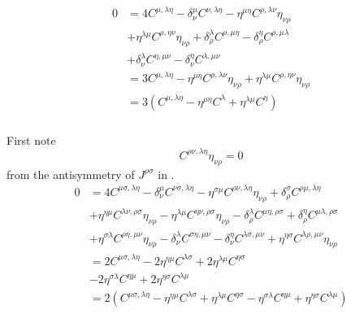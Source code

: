 \subsubsection{ }
\begin{align*}
	0&=4 C^{\mu,\lambda \eta}-\delta^\mu_\nu C^{\nu,\lambda \eta}-\eta^{\mu \eta}C^{\rho,\lambda \nu}\eta_{\nu\rho}\\
	&+\eta^{\lambda\mu} C^{\rho,\eta \nu}\eta_{\nu\rho}+\delta^\lambda_\rho C^{\rho,\mu \eta}-\delta^\eta_\rho C^{\rho,\mu \lambda}\\
	&+\delta^\lambda_\nu C^{\eta,\mu\nu}-\delta^\eta_\nu C^{\lambda, \mu \nu}\\
	&=3C^{\mu,\lambda \eta} -\eta^{\mu \eta}C^{\rho,\lambda \nu}\eta_{\nu\rho}
	+\eta^{\lambda\mu} C^{\rho,\eta \nu}\eta_{\nu\rho}\\
	&=3\left(C^{\mu,\lambda \eta}-\eta^{\mu \eta}C^\lambda+\eta^{\lambda\mu}C^\eta\right)
\end{align*}

\subsubsection{ }
First note \[C^{\rho\nu,\lambda\eta}\eta_{\nu \rho}=0\]
from the antisymmetry of $J^{\rho\sigma}$ in .
\begin{align*}
	0&=4C^{\mu\sigma,\lambda\eta}-\delta^\mu_\nu C^{\nu\sigma,\lambda\eta}-\eta^{\sigma\mu}C^{\rho\nu,\lambda\eta}\eta_{\nu \rho}+\delta^\sigma_\rho C^{\rho\mu,\lambda\eta}\\
	&+\eta^{\eta\mu}C^{\lambda\nu,\rho\sigma}\eta_{\nu \rho}-\eta^{\lambda \mu}C^{\eta \nu,\rho \sigma}\eta_{\nu \rho}-\delta^\lambda_\rho C^{\mu\eta,\rho\sigma}+\delta^\eta_\rho C^{\mu\lambda,\rho\sigma}\\
	&+\eta^{\sigma \lambda}C^{\rho\eta,\mu\nu}\eta_{\nu \rho}-\delta^\lambda_\nu C^{\sigma\eta,\mu\nu}-\delta^\eta_\nu C^{\lambda\sigma,\mu\nu}+\eta^{\eta \sigma} C^{\lambda\rho, \mu\nu }\eta_{\nu \rho}\\
	&=2C^{\mu\sigma,\lambda\eta}-2\eta^{\eta\mu}C^{\lambda\sigma}+2\eta^{\lambda \mu}C^{\eta \sigma}\\
	&-2\eta^{\sigma \lambda}C^{\eta\mu}+2\eta^{\eta \sigma} C^{\lambda \mu }\\
	&=2\left(C^{\mu\sigma,\lambda\eta}-\eta^{\eta\mu}C^{\lambda\sigma}+\eta^{\lambda \mu}C^{\eta \sigma}
	-\eta^{\sigma \lambda}C^{\eta\mu}+\eta^{\eta \sigma} C^{\lambda \mu }\right)
\end{align*}

